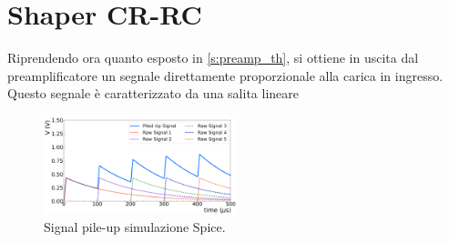 \documentclass[a4paper,11pt]{article} %
\begin{document}

\section{Shaper CR-RC}\label{s:shaper} 

Riprendendo ora quanto esposto in \autoref{s:preamp_th}, si ottiene in uscita dal preamplificatore un segnale
direttamente proporzionale alla carica in ingresso. Questo segnale è caratterizzato da una salita lineare 

\begin{figure}
	\centering
	\includegraphics[width=0.5\textwidth]{../Plots/PreAmp/signal_pileup.png}
	\vspace{-20pt}
	\caption{\small Signal pile-up simulazione Spice.}
	\label{i:preamp_pileup}
\end{figure}
\end{document}
